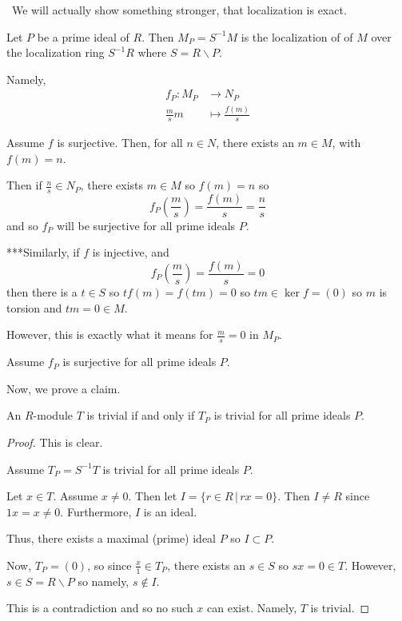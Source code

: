 \documentclass[12pt]{Qual}
\begin{document}
\begin{solution}$\,$
We will actually show something stronger, that localization is exact.

Let $P$ be a prime ideal of $R$. Then $M_P=S^{-1}M$ is the localization of of $M$ over the localization ring $S^{-1}R$ where $S=R\backslash P$.

Namely, \begin{align*}
    f_P:M_P&\to N_P\\
    \frac{m}{s}m&\mapsto\frac{f(m)}{s}
\end{align*}


\boxed{\implies} Assume $f$ is surjective. Then, for all $n\in N$, there exists an $m\in M$, with $f(m)=n$.

Then if $\frac{n}{s}\in N_P$, there exists $m\in M$ so $f(m)=n$ so $$f_P\left(\frac{m}{s}\right)=\frac{f(m)}{s}=\frac{n}{s}$$ and so $f_P$ will be surjective for all prime ideals $P$.

\begin{mybox}
***Similarly, if $f$ is injective, and $$f_P\left(\frac{m}{s}\right)=\frac{f(m)}{s}=0$$ then there is a $t\in S$ so $tf(m)=f(tm)=0$ so $tm\in\ker f=(0)$ so $m$ is torsion and $tm=0\in M$.

However, this is exactly what it means for $\frac{m}{s}=0$ in $M_P$.
\end{mybox}

\boxed{\impliedby} Assume $f_P$ is surjective for all prime ideals $P$.

Now, we prove a claim.
\begin{claim} An $R$-module $T$ is trivial if and only if $T_P$ is trivial for all prime ideals $P.$
\begin{proof}

\boxed{\implies} This is clear.

\boxed{\impliedby} Assume $T_P=S^{-1}T$ is trivial for all prime ideals $P$.

Let $x\in T$. Assume $x\not=0$. Then let $I=\{r\in R\,|\,rx=0\}.$ Then $I\not=R$ since $1x=x\not=0$. Furthermore, $I$ is an ideal.

Thus, there exists a maximal (prime) ideal $P$ so $I\subset P$.

Now, $T_P=(0)$, so since $\frac{x}{1}\in T_P$, there exists an $s\in S$ so $sx=0\in T$. However, $s\in S=R\backslash P$ so namely, $s\notin I$.

This is a contradiction and so no such $x$ can exist. Namely, $T$ is trivial.
\end{proof}
\end{claim}


\end{solution}
\end{document}
